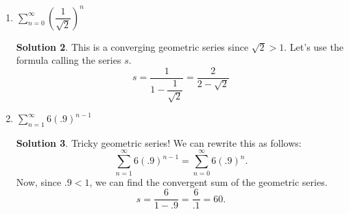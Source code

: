 \documentclass[10pt]{article}
\newcommand{\ds}{\displaystyle}
\theoremstyle{Theorem}
\theoremstyle{definition}
\newtheorem*{solution}{Solution}
\theoremstyle{remark}
\theoremstyle{custom}
\begin{document}
\begin{enumerate}[1.]
\begin{solution}
\end{solution}
\item $\ds \sum_{n=0}^{\infty} \left( \dfrac{1}{\sqrt{2}}\right)^n$
\begin{solution}
This is a converging geometric series since $\sqrt{2}>1$. Let's use the formula calling the series $s$.
\[
s=\dfrac{1}{1-\dfrac{1}{\sqrt{2}}}=\dfrac{2}{2-\sqrt{2}}
\]
\end{solution}
\item $\ds \sum_{n=1}^{\infty} 6(.9)^{n-1}$
\begin{solution}
Tricky geometric series! We can rewrite this as follows:
\[
\ds \sum_{n=1}^{\infty} 6(.9)^{n-1}=\ds \sum_{n=0}^{\infty}6(.9)^n.
\]
Now, since $.9<1$, we can find the convergent sum of the geometric series.
\[
s=\dfrac{6}{1-.9}=\dfrac{6}{.1}=60.
\]
\end{solution}
\end{enumerate}
\end{document}
